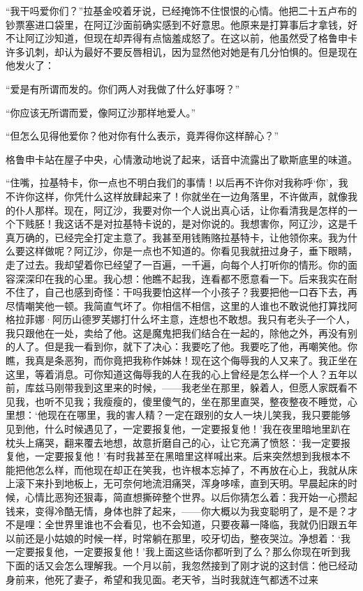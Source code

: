 \par “我干吗爱你们？”拉基金咬着牙说，已经掩饰不住恨恨的心情。他把二十五卢布的钞票塞进口袋里，在阿辽沙面前确实感到不好意思。他原来是打算事后才拿钱，好不让阿辽沙知道，但现在却弄得有点恼羞成怒了。在这以前，他虽然受了格鲁申卡许多讥刺，却认为最好不要反唇相讥，因为显然他对她是有几分怕惧的。但是现在他发火了：
\par “爱是有所谓而发的。你们两人对我做了什么好事呀？”
\par “你应该无所谓而爱，像阿辽沙那样地爱人。”
\par “但怎么见得他爱你？他对你有什么表示，竟弄得你这样醉心？”
\par 格鲁申卡站在屋子中央，心情激动地说了起来，话音中流露出了歇斯底里的味道。
\par “住嘴，拉基特卡，你一点也不明白我们的事情！以后再不许你对我称呼‘你’，我不许你这样，你凭什么这样放肆起来了！你就坐在一边角落里，不许做声，就像我的仆人那样。现在，阿辽沙，我要对你一个人说出真心话，让你看清我是怎样的一个下贱胚！我这话不是对拉基特卡说的，是对你说的。我想害你，阿辽沙，这是千真万确的，已经完全打定主意了。我甚至用钱贿赂拉基特卡，让他领你来。我为什么要这样做呢？阿辽沙，你是一点也不知道的。你看见我就扭过身子，垂下眼睛，走了过去。我却望着你已经望了一百遍，一千遍，向每个人打听你的情形。你的面容深深印在我的心里。我心想：他瞧不起我，连看都不愿意看一下。后来我实在耐不住了，自己也感到奇怪：干吗我要怕这样一个小孩子？我要把他一口吞下去，再尽情嘲笑他一顿。我简直气坏了。你相信不相信，这里的人谁也不敢说他打算找阿格拉菲娜·阿历山德罗芙娜打什么坏主意，连想也不敢想。我只有老头子一个人，我只跟他在一处，卖给了他。这是魔鬼把我们结合在一起的，除他之外，再没有别的人了。但是我一看到你，就下了决心：我要吃了他。我要吃了他，再嘲笑他。你瞧，我真是条恶狗，而你竟把我称作姊妹！现在这个侮辱我的人又来了。我正坐在这里，等着消息。可你知道这侮辱我的人在我的心上曾经是怎么样一个人？五年以前，库兹马刚带我到这里来的时候，——我老坐在那里，躲着人，但愿人家既看不见我，也听不见我；我瘦瘦的，傻里傻气的，坐在那里直哭，整夜整夜不睡觉，心里想：‘他现在在哪里，我的害人精？一定在跟别的女人一块儿笑我，我只要能够见到他，什么时候遇见了，一定要报复他，一定要报复他！’我在夜里暗地里趴在枕头上痛哭，翻来覆去地想，故意折磨自己的心，让它充满了愤怒：‘我一定要报复他，一定要报复他！’有时我甚至在黑暗里这样喊出来。后来突然想到我根本不能把他怎么样，而他现在却正在笑我，也许根本忘掉了，不再放在心上，我就从床上滚下来扑到地板上，无可奈何地流泪痛哭，浑身哆嗦，直到天明。早晨起床的时候，心情比恶狗还狠毒，简直想撕碎整个世界。以后你猜怎么着：我开始一心攒起钱来，变得冷酷无情，身体也胖了起来，——你大概以为我变聪明了，是不是？才不是哩：全世界里谁也不会看见，也不会知道，只要夜幕一降临，我就仍旧跟五年以前还是小姑娘的时候一样，时常躺在那里，咬牙切齿，整夜哭泣。净想着：‘我一定要报复他，一定要报复他！’我上面这些话你都听到了么？那么你现在听到我下面的话又会怎么理解我。一个月以前，我忽然接到了刚才说的这封信：他已经动身前来，他死了妻子，希望和我见面。老天爷，当时我就连气都透不过来